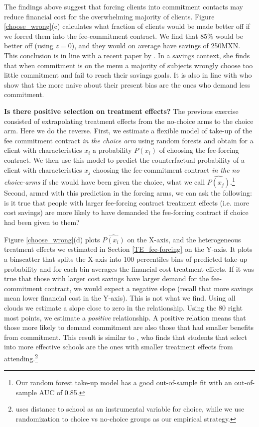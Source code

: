 \documentclass[oneside,11pt]{article}
\begin{document}
The findings above suggest that forcing clients into commitment contacts may reduce financial cost for the overwhelming majority of clients. Figure \ref{choose_wrong}(c) calculates what fraction of clients would be made better off if we forced them into the fee-commitment contract. We find that 85\% would be better off (using $z=0$), and they would on average have savings of 250MXN. This conclusion is in line with a recent paper by \cite{John}. In a savings context, she finds that when commitment is on the menu a majority of subjects wrongly choose too little commitment and fail to reach their savings goals. It is also in line with \cite{Sprenger} who show that the more naive about their present bias are the ones who demand less commitment.

    
\vspace{.2in}
\noindent \textbf{Is there positive selection on treatment effects?} The previous exercise consisted of extrapolating treatment effects from the no-choice arms to the choice arm. Here we do the reverse. First, we estimate a flexible model of take-up of the fee commitment contract \textit{in the choice arm} using random forests and obtain for a client with characteristics $x_i$ a probability $P(x_i)$ of choosing the fee-forcing contract. We then use this model to predict the counterfactual probability of a client with characteristics $x_j$ choosing the fee-commitment contract \textit{in the no choice-arms} if she would have been given the choice, what we call $\widehat{P(x_j)}$.\footnote{Our random forest take-up model has a good out-of-sample fit with an out-of-sample AUC of 0.85.} Second, armed with this prediction in the forcing arms, we can ask the following: is it true that people with larger fee-forcing contract treatment effects (i.e. more cost savings) are more likely to have demanded the fee-forcing contract if choice had been given to them? 

Figure \ref{choose_wrong}(d) plots $\widehat{P(x_i)}$ on the X-axis, and the heterogeneous treatment effects we estimated in Section \ref{TE_fee-forcing} on the Y-axis. It plots a binscatter that splits the X-axis into 100 percentiles bins of predicted take-up probability and for each bin averages the financial cost treatment effects. If it was true that those with larger cost savings have larger demand for the fee-commitment contract, we would expect a negative slope (recall that more savings mean lower financial cost in the Y-axis). This is not what we find.  Using all clouds we estimate a slope close to zero in the relationship. Using the 80 right most points, we estimate a \textit{positive} relationship. A positive relation means that those more likely to demand commitment are also those that had smaller benefits from commitment. This result is similar to \cite{Walters}, who finds that students that select into more effective schools are the ones with smaller treatment effects from attending.\footnote{\cite{Walters} uses distance to school as an instrumental variable for choice, while we use randomization to choice vs no-choice groups as our empirical strategy.}
\end{document}
